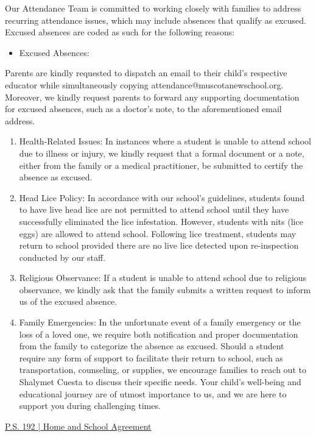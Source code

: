 \documentclass[letterpaper, 11pt]{article}
\begin{document}
Our Attendance Team is committed to working closely with families to address recurring attendance issues, which may include absences that qualify as excused. Excused absences are coded as such for the following reasons:
\begin{itemize}
\item Excused Absences:
\end{itemize}
Parents are kindly requested to dispatch an email to their child’s respective educator
while simultaneously copying attendance@muscotanewschool.org. Moreover, we kindly request parents to forward any supporting documentation for excused absences, such as a doctor’s note, to the aforementioned email address.
\begin{enumerate}
\item Health-Related Issues: In instances where a student is unable to attend school due to illness or injury, we kindly request that a formal document or a note, either from the family or a medical practitioner, be submitted to certify the absence as excused.
\item Head Lice Policy: In accordance with our school’s guidelines, students found to have live head lice are not permitted to attend school until they have successfully eliminated the lice infestation. However, students with nits (lice eggs) are allowed to attend school. Following lice treatment, students may return to school provided there are no live lice detected upon re-inspection conducted by our staff.
\item Religious Observance: If a student is unable to attend school due to religious observance, we kindly ask that the family submits a written request to inform us of the excused absence.
\item Family Emergencies: In the unfortunate event of a family emergency or the loss of a loved one, we require both notification and proper documentation from the family to categorize the absence as excused. Should a student require any form of support to facilitate their return to school, such as transportation, counseling, or supplies, we encourage families to reach out to Shalymet Cuesta to discuss their specific needs. Your child’s well-being and educational journey are of utmost importance to us, and we are here to support you during challenging times.
\end{enumerate}

\href{https://4.files.edl.io/d109/09/17/23/012751-34dac161-8e19-4033-8c6b-f369007cab02.pdf}{P.S. 192 | Home and School Agreement}
\end{document}
